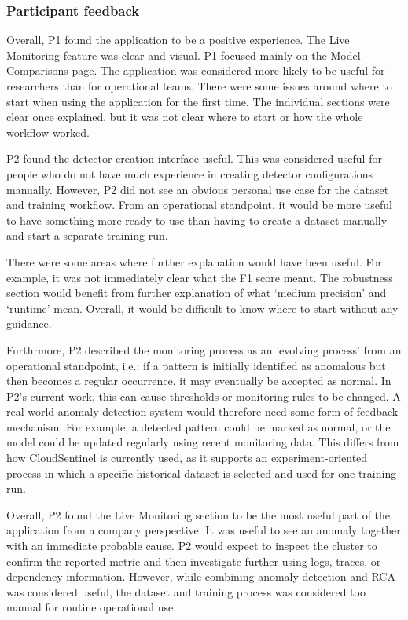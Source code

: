 \subsubsection{Participant feedback}

Overall, P1 found the application to be a positive experience. The Live Monitoring feature was clear and visual. P1 focused mainly on the Model Comparisons page. The application was considered more likely to be useful for researchers than for operational teams. There were some issues around where to start when using the application for the first time. The individual sections were clear once explained, but it was not clear where to start or how the whole workflow worked.

P2 found the detector creation interface useful. This was considered useful for people who do not have much experience in creating detector configurations manually. However, P2 did not see an obvious personal use case for the dataset and training workflow. From an operational standpoint, it would be more useful to have something more ready to use than having to create a dataset manually and start a separate training run.

There were some areas where further explanation would have been useful. For example, it was not immediately clear what the F1 score meant. The robustness section would benefit from further explanation of what ‘medium precision’ and ‘runtime’ mean. Overall, it would be difficult to know where to start without any guidance.


Furthrmore, P2 described the monitoring process as an 'evolving process' from an operational standpoint, i.e.: if a pattern is initially identified as anomalous but then becomes a regular occurrence, it may eventually be accepted as normal. In P2’s current work, this can cause thresholds or monitoring rules to be changed. A real-world anomaly-detection system would therefore need some form of feedback mechanism. For example, a detected pattern could be marked as normal, or the model could be updated regularly using recent monitoring data. This differs from how CloudSentinel is currently used, as it supports an experiment-oriented process in which a specific historical dataset is selected and used for one training run.

Overall, P2 found the Live Monitoring section to be the most useful part of the application from a company perspective. It was useful to see an anomaly together with an immediate probable cause. P2 would expect to inspect the cluster to confirm the reported metric and then investigate further using logs, traces, or dependency information. However, while combining anomaly detection and RCA was considered useful, the dataset and training process was considered too manual for routine operational use.

